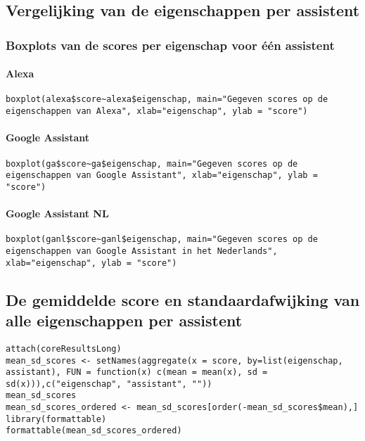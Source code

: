 \subsection{Vergelijking van de eigenschappen per assistent}
\subsubsection{Boxplots van de scores per eigenschap voor één assistent}
\paragraph{Alexa}
\begin{lstlisting}
boxplot(alexa$score~alexa$eigenschap, main="Gegeven scores op de eigenschappen van Alexa", xlab="eigenschap", ylab = "score")
\end{lstlisting}

\paragraph{Google Assistant}
\begin{lstlisting}
boxplot(ga$score~ga$eigenschap, main="Gegeven scores op de eigenschappen van Google Assistant", xlab="eigenschap", ylab = "score")
\end{lstlisting}

\paragraph{Google Assistant NL}
\begin{lstlisting}
boxplot(ganl$score~ganl$eigenschap, main="Gegeven scores op de eigenschappen van Google Assistant in het Nederlands", xlab="eigenschap", ylab = "score")
\end{lstlisting}

\subsection{De gemiddelde score en standaardafwijking van alle eigenschappen per assistent}
\begin{lstlisting}
attach(coreResultsLong)
mean_sd_scores <- setNames(aggregate(x = score, by=list(eigenschap, assistant), FUN = function(x) c(mean = mean(x), sd = sd(x))),c("eigenschap", "assistant", ""))
mean_sd_scores
mean_sd_scores_ordered <- mean_sd_scores[order(-mean_sd_scores$mean),]
library(formattable)
formattable(mean_sd_scores_ordered)
\end{lstlisting}

